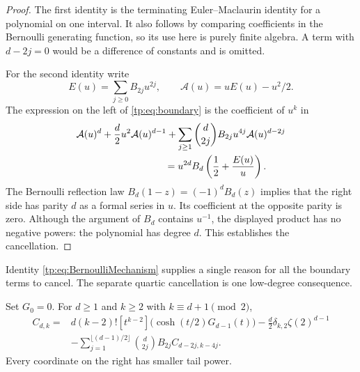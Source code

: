 \begin{proof}
The first identity is the terminating Euler--Maclaurin identity for a
polynomial on one interval.  It also follows by comparing coefficients
in the Bernoulli generating function, so its use here is purely finite
algebra.  A term with $d-2j=0$ would be a difference of constants and is
omitted.

For the second identity write
\[
 E(u)=\sum_{j\geq0}B_{2j}u^{2j},\qquad
 \mathcal A(u)=uE(u)-u^2/2.
\]
The expression on the left of \eqref{tp:eq:boundary} is the coefficient
of $u^k$ in
\begin{equation}\label{tp:eq:BernoulliMechanism}
 \begin{split}
 &\mathcal A(u)^d+\frac d2u^2\mathcal A(u)^{d-1}
 +\sum_{j\geq1}\binom d{2j}B_{2j}u^{4j}\mathcal A(u)^{d-2j}\\
 &\hspace{32mm}=u^{2d}B_d\left(\frac12+\frac{E(u)}u\right).
 \end{split}
\end{equation}
The Bernoulli reflection law $B_d(1-z)=(-1)^dB_d(z)$ implies that
the right side has parity $d$ as a formal series in $u$.  Its
coefficient at the opposite parity is zero.  Although the argument of
$B_d$ contains $u^{-1}$, the displayed product has no negative powers:
the polynomial has degree $d$.  This establishes the cancellation.
\end{proof}

Identity \eqref{tp:eq:BernoulliMechanism} supplies a single reason for
all the boundary terms to cancel.  The separate quartic cancellation
is one low-degree consequence.

\begin{theorem}
\label{tp:thm:recurrence}
Set $G_0=0$.  For $d\geq1$ and $k\geq2$ with
$k\equiv d+1\pmod2$,
\begin{equation}\label{tp:eq:recurrence}
 \boxed{\begin{aligned}
 C_{d,k}={}&d(k-2)![t^{k-2}]\bigl(\cosh(t/2)G_{d-1}(t)\bigr)
       -\frac d2\delta_{k,2}\zeta(2)^{d-1}\\
 &-\sum_{j=1}^{\lfloor(d-1)/2\rfloor}
       \binom d{2j}B_{2j}C_{d-2j,k-4j}.
 \end{aligned}}
\end{equation}
Every coordinate on the right has smaller tail power.
\end{theorem}

